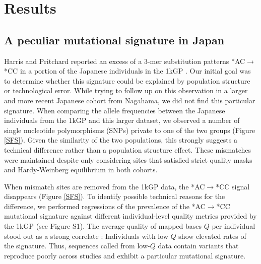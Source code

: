 \documentclass[9pt,article]{template}
\begin{document}
\section{Results}

			
\subsection{A peculiar mutational signature in Japan}			
	
Harris and Pritchard reported an excess of a 3-mer substitution patterns *AC${\rightarrow}$*CC in a portion of the Japanese individuals in the 1kGP \citep{Harris2017a}.
Our initial goal was to determine whether this signature could be explained by population structure or technological error.
While trying to follow up on this observation in a larger and more recent Japanese cohort from Nagahama, we did not find this particular signature.
When comparing the allele frequencies between the Japanese individuals from the 1kGP and this larger dataset, we observed a number of single nucleotide polymorphisms (SNPs) private to one of the two groups (Figure \ref{SFS}).
Given the similarity of the two populations, this strongly suggests a technical difference rather than a population structure effect.
These mismatches were maintained despite only considering sites that satisfied strict quality masks and Hardy-Weinberg equilibrium in both cohorts.

When mismatch sites are removed from the 1kGP data, the  *AC${\rightarrow}$*CC signal disappears (Figure \ref{SFS}). To identify possible technical reasons for the difference, we performed regressions of the prevalence of the  *AC${\rightarrow}$*CC mutational signature against different individual-level quality metrics provided by the 1kGP (see Figure S1). %
The average quality of mapped bases  $Q$ per individual stood out as a strong correlate : Individuals with low $Q$ show elevated rates of the signature. 
Thus, sequences called from low-$Q$ data contain variants that reproduce poorly across studies and exhibit a particular mutational signature. 
\end{document}
